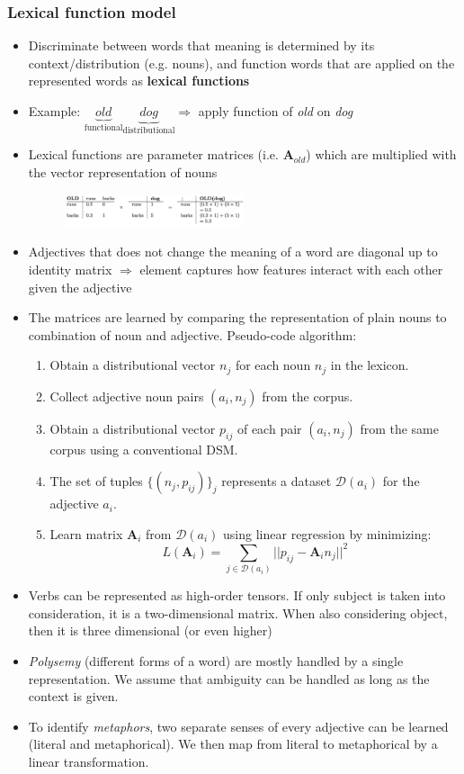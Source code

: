 \subsubsection{Lexical function model}
\begin{itemize}
	\item Discriminate between words that meaning is determined by its context/distribution (e.g. nouns), and function words that are applied on the represented words as \textbf{lexical functions}
	\item Example: $\underbrace{\textit{old}}_{\text{functional}} \underbrace{\textit{dog}}_{\text{distributional}} \Rightarrow$ apply function of \textit{old} on \textit{dog}
	\item Lexical functions are parameter matrices (i.e. $\bm{A}_{\textit{old}}$) which are multiplied with the vector representation of nouns
	\begin{figure}[ht]
		\centering
		\includegraphics[width=0.5\textwidth]{figures/compositional_semantics_lexical_function_models_adjectives.png}
	\end{figure}
	\item Adjectives that does not change the meaning of a word are diagonal up to identity matrix $\Rightarrow$ element captures how features interact with each other given the adjective
	\item The matrices are learned by comparing the representation of plain nouns to combination of noun and adjective. Pseudo-code algorithm:
	\begin{enumerate}
		\item Obtain a distributional vector $n_j$ for each noun $n_j$ in the lexicon.
		\item Collect adjective noun pairs $(a_i,n_j)$ from the corpus.
		\item Obtain a distributional vector $p_{ij}$ of each pair $(a_i,n_j)$ from the same corpus using a conventional DSM.
		\item The set of tuples $\{(n_j,p_{ij})\}_j$ represents a dataset $\mathcal{D}(a_i)$ for the adjective $a_i$.
		\item Learn matrix $\bm{A}_i$ from $\mathcal{D}(a_i)$ using linear regression by minimizing:
		$$L(\bm{A}_i) = \sum\limits_{j\in \mathcal{D}(a_i)} ||p_{ij} - \bm{A}_i n_j||^2$$
	\end{enumerate} 
	\item Verbs can be represented as high-order tensors. If only subject is taken into consideration, it is a two-dimensional matrix. When also considering object, then it is three dimensional (or even higher)
	\item \textit{Polysemy} (different forms of a word) are mostly handled by a single representation. We assume that ambiguity can be handled as long as the context is given.
	\item To identify \textit{metaphors}, two separate senses of every adjective can be learned (literal and metaphorical). We then map from literal to metaphorical by a linear transformation. 
\end{itemize}
